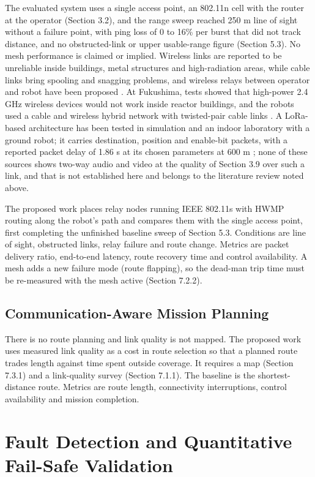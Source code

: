 The evaluated system uses a single access point, an 802.11n cell with the router at the operator (Section 3.2), and the range sweep reached 250 m line of sight without a failure point, with ping loss of 0 to 16\% per burst that did not track distance, and no obstructed-link or upper usable-range figure (Section 5.3). No mesh performance is claimed or implied. Wireless links are reported to be unreliable inside buildings, metal structures and high-radiation areas, while cable links bring spooling and snagging problems, and wireless relays between operator and robot have been proposed \cite{schneider2016}. At Fukushima, tests showed that high-power 2.4 GHz wireless devices would not work inside reactor buildings, and the robots used a cable and wireless hybrid network with twisted-pair cable links \cite{nagatani2013}. A LoRa-based architecture has been tested in simulation and an indoor laboratory with a ground robot; it carries destination, position and enable-bit packets, with a reported packet delay of 1.86 s at its chosen parameters at 600 m \cite{manuel2022}; none of these sources shows two-way audio and video at the quality of Section 3.9 over such a link, and that is not established here and belongs to the literature review noted above.

The proposed work places relay nodes running IEEE 802.11s with HWMP routing along the robot's path and compares them with the single access point, first completing the unfinished baseline sweep of Section 5.3. Conditions are line of sight, obstructed links, relay failure and route change. Metrics are packet delivery ratio, end-to-end latency, route recovery time and control availability. A mesh adds a new failure mode (route flapping), so the dead-man trip time must be re-measured with the mesh active (Section 7.2.2).

\subsection{Communication-Aware Mission Planning}

There is no route planning and link quality is not mapped. The proposed work uses measured link quality as a cost in route selection so that a planned route trades length against time spent outside coverage. It requires a map (Section 7.3.1) and a link-quality survey (Section 7.1.1). The baseline is the shortest-distance route. Metrics are route length, connectivity interruptions, control availability and mission completion.

\section{Fault Detection and Quantitative Fail-Safe Validation}

